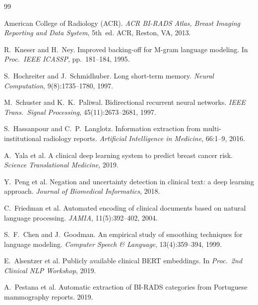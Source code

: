 \documentclass[11pt,a4paper]{article}
\begin{document}
\begin{thebibliography}{99}

American College of Radiology (ACR).
\textit{ACR BI-RADS Atlas, Breast Imaging Reporting and Data System}, 5th~ed.
ACR, Reston, VA, 2013.

R.~Kneser and H.~Ney.
Improved backing-off for M-gram language modeling.
In \textit{Proc.\ IEEE ICASSP}, pp.~181--184, 1995.

S.~Hochreiter and J.~Schmidhuber.
Long short-term memory.
\textit{Neural Computation}, 9(8):1735--1780, 1997.

M.~Schuster and K.~K.~Paliwal.
Bidirectional recurrent neural networks.
\textit{IEEE Trans.\ Signal Processing}, 45(11):2673--2681, 1997.

S.~Hassanpour and C.~P.~Langlotz.
Information extraction from multi-institutional radiology reports.
\textit{Artificial Intelligence in Medicine}, 66:1--9, 2016.

A.~Yala et al.
A clinical deep learning system to predict breast cancer risk.
\textit{Science Translational Medicine}, 2019.

Y.~Peng et al.
Negation and uncertainty detection in clinical text: a deep learning approach.
\textit{Journal of Biomedical Informatics}, 2018.

C.~Friedman et al.
Automated encoding of clinical documents based on natural language processing.
\textit{JAMIA}, 11(5):392--402, 2004.

S.~F.~Chen and J.~Goodman.
An empirical study of smoothing techniques for language modeling.
\textit{Computer Speech \& Language}, 13(4):359--394, 1999.

E.~Alsentzer et al.
Publicly available clinical BERT embeddings.
In \textit{Proc.\ 2nd Clinical NLP Workshop}, 2019.

A.~Pestana et al.
Automatic extraction of BI-RADS categories from Portuguese mammography reports.
2019.

\end{thebibliography}
\end{document}
